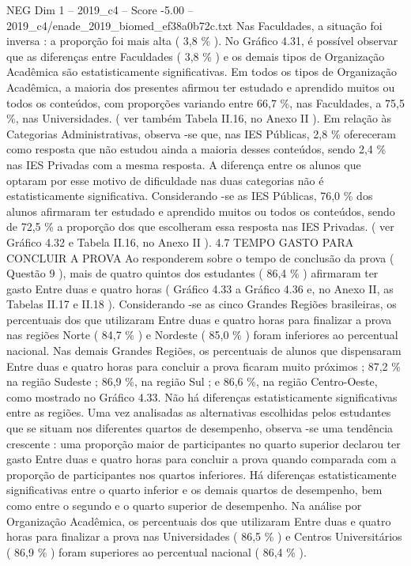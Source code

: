 \begin{textsample}{NEG Dim 1 – 2019\_c4 – Score -5.00 – 2019\_c4/enade\_2019\_biomed\_ef38a0b72c.txt}
Nas Faculdades, a situação foi inversa : a proporção foi mais alta ( 3,8 \% ).
No Gráfico 4.31, é possível observar que as diferenças entre Faculdades ( 3,8 \% ) e os demais tipos de Organização Acadêmica são estatisticamente significativas.
Em todos os tipos de Organização Acadêmica, a maioria dos presentes afirmou ter estudado e aprendido muitos ou todos os conteúdos, com proporções variando entre 66,7 \%, nas Faculdades, a 75,5 \%, nas Universidades. ( ver também Tabela II.16, no Anexo II ).
Em relação às Categorias Administrativas, observa -se que, nas IES Públicas, 2,8 \% ofereceram como resposta que não estudou ainda a maioria desses conteúdos, sendo 2,4 \% nas IES Privadas com a mesma resposta.
A diferença entre os alunos que optaram por esse motivo de dificuldade nas duas categorias não é estatisticamente significativa.
Considerando -se as IES Públicas, 76,0 \% dos alunos afirmaram ter estudado e aprendido muitos ou todos os conteúdos, sendo de 72,5 \% a proporção dos que escolheram essa resposta nas IES Privadas. ( ver Gráfico 4.32 e Tabela II.16, no Anexo II ). 4.7 TEMPO GASTO PARA CONCLUIR A PROVA Ao responderem sobre o tempo de conclusão da prova ( Questão 9 ), mais de quatro quintos dos estudantes ( 86,4 \% ) afirmaram ter gasto Entre duas e quatro horas ( Gráfico 4.33 a Gráfico 4.36 e, no Anexo II, as Tabelas II.17 e II.18 ).
Considerando -se as cinco Grandes Regiões brasileiras, os percentuais dos que utilizaram Entre duas e quatro horas para finalizar a prova nas regiões Norte ( 84,7 \% ) e Nordeste ( 85,0 \% ) foram inferiores ao percentual nacional.
Nas demais Grandes Regiões, os percentuais de alunos que dispensaram Entre duas e quatro horas para concluir a prova ficaram muito próximos ; 87,2 \% na região Sudeste ; 86,9 \%, na região Sul ; e 86,6 \%, na região Centro-Oeste, como mostrado no Gráfico 4.33.
Não há diferenças estatisticamente significativas entre as regiões.
Uma vez analisadas as alternativas escolhidas pelos estudantes que se situam nos diferentes quartos de desempenho, observa -se uma tendência crescente : uma proporção maior de participantes no quarto superior declarou ter gasto Entre duas e quatro horas para concluir a prova quando comparada com a proporção de participantes nos quartos inferiores.
Há diferenças estatisticamente significativas entre o quarto inferior e os demais quartos de desempenho, bem como entre o segundo e o quarto superior de desempenho.
Na análise por Organização Acadêmica, os percentuais dos que utilizaram Entre duas e quatro horas para finalizar a prova nas Universidades ( 86,5 \% ) e Centros Universitários ( 86,9 \% ) foram superiores ao percentual nacional ( 86,4 \% ).

\end{textsample}
